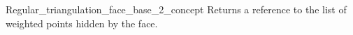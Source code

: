 \begin{ccRefConcept}{Regular_triangulation_face_base_2_concept}
{Returns a reference to the list of weighted points
hidden by the face.}


\ccHasModels
{}

\ccSeeAlso
{}

\end{ccRefConcept}


